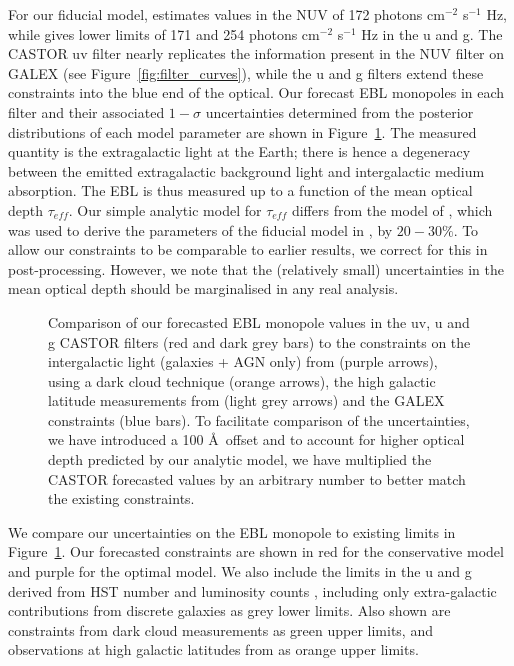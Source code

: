 \documentclass[fleqn,usenatbib]{mnras}
\begin{document}
For our fiducial model, \cite{Chiang_2019} estimates values in the NUV of 172 photons cm$^{-2}$ s$^{-1}$ Hz, while \cite{Driver2016} gives lower limits of 171 and 254 photons cm$^{-2}$ s$^{-1}$ Hz in the u and g. The {\small CASTOR} uv filter nearly replicates the information present in the NUV filter on GALEX (see Figure~\ref{fig:filter_curves}), while the u and g filters extend these constraints into the blue end of the optical. Our forecast EBL monopoles in each filter and their associated $1-\sigma$ uncertainties determined from the posterior distributions of each model parameter are shown in Figure~\ref{fig:Literaturecomparison}. The measured quantity is the extragalactic light at the Earth; there is hence a degeneracy between the emitted extragalactic background light and intergalactic medium absorption. The EBL is thus measured up to a function of the mean optical depth $\tau_{eff}$. Our simple analytic model for $\tau_{eff}$ differs from the model of  \cite{Inoue2014}, which was used to derive the parameters of the fiducial model in \cite{Chiang_2019}, by $20-30\%$. To allow our constraints to be comparable to earlier results, we correct for this in post-processing. However, we note that the (relatively small) uncertainties in the mean optical depth should be marginalised in any real analysis.

\begin{figure}
\caption{Comparison of our forecasted EBL monopole values in the uv, u and g {\small CASTOR} filters (red and dark grey bars) to the constraints on the intergalactic light (galaxies + AGN only) from \citet{Driver2016} (purple arrows), \citet{Mattila2017} using a dark cloud technique (orange arrows), the high galactic latitude measurements from \citet{Hamden2013} (light grey arrows) and the GALEX constraints (blue bars). To facilitate comparison of the uncertainties, we have introduced a 100 \AA\ offset and to account for higher optical depth predicted by our analytic model, we have multiplied the {\small CASTOR} forecasted values by an arbitrary number to better match the existing constraints. \label{fig:Literaturecomparison} }
\end{figure}


We compare our uncertainties on the EBL monopole to existing limits in Figure~\ref{fig:Literaturecomparison}. Our forecasted constraints are shown in red for the conservative model and purple for the optimal model. We also include the limits in the u and g derived from HST number and luminosity counts \citep{Driver2016}, including only extra-galactic contributions from discrete galaxies as grey lower limits. Also shown are constraints from dark cloud measurements \citep{Mattila2012} as green upper limits, and observations at high galactic latitudes from \cite{Hamden2013} as orange upper limits. 
\end{document}
